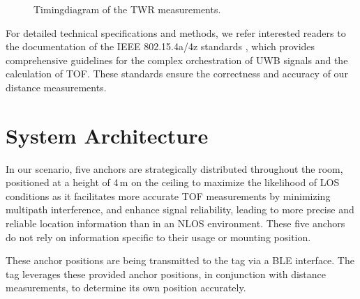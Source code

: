 \documentclass[conference, a4paper]{IEEEtran}
\begin{document}
\begin{figure}
	\centering
	\caption{Timingdiagram of the \ac{TWR} measurements.}
	\label{fig:csvbarchart}
\end{figure}

For detailed technical specifications and methods,
we refer interested readers to the documentation of
the IEEE 802.15.4a/4z standards \cite{IEEE802154a} \cite{IEEE802154z},
which provides comprehensive guidelines for the
complex orchestration of \ac{UWB} signals and the calculation of \ac{TOF}.
These standards ensure the correctness and accuracy of our distance measurements.

\section{System Architecture}\label{section:system_arch}
In our scenario, five anchors are strategically distributed throughout the room,
positioned at a height of 4\,m on the ceiling to maximize the likelihood of 
\ac{LOS} conditions as it facilitates more accurate \ac{TOF} measurements by minimizing multipath interference, and enhance signal reliability, leading to more precise and reliable location information than in an \ac{NLOS} environment.
These five anchors do not rely on information specific to their usage or mounting position.

These anchor positions are being transmitted to the tag via a \ac{BLE} interface. 
The tag leverages these provided anchor positions,
in conjunction with distance measurements,
to determine its own position accurately. 
\end{document}
